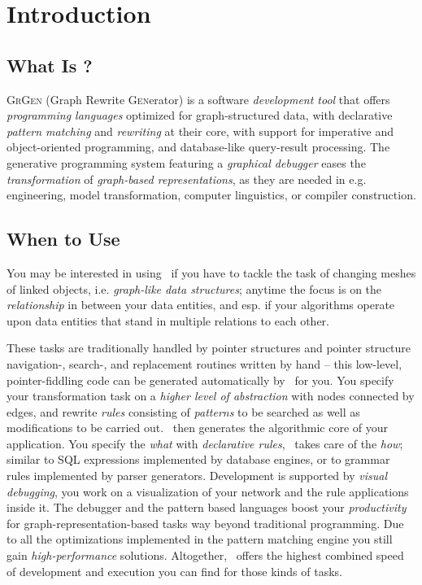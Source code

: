 \chapter{Introduction}
\label{chp:intro}


\section{What Is \GrG?}

{\scshape GrGen} (\textsc{G}raph \textsc{R}ewrite \textsc{Gen}erator) is a software \emph{development tool} that offers \emph{programming languages} optimized for graph-structured data, with declarative \emph{pattern matching} and \emph{rewriting} at their core, with support for imperative and object-oriented programming, and database-like query-result processing.
The generative programming system featuring a \emph{graphical debugger} eases the \emph{transformation} of \emph{graph-based representations}, as they are needed in e.g. engineering, model transformation, computer linguistics, or compiler construction.

\section{When to Use \GrG}
You may be interested in using \GrG\ if you have to tackle the task of changing meshes of linked objects, i.e. \emph{graph-like data structures};
anytime the focus is on the \emph{relationship} in between your data entities,
and esp. if your algorithms operate upon data entities that stand in multiple relations to each other.

These tasks are traditionally handled by pointer structures and pointer structure navi\-gation-, search-, and replacement routines written by hand
-- this low-level, pointer-fiddling code can be generated automatically by \GrG\ for you.
You specify your transformation task on a \emph{higher level of abstraction} with nodes connected by edges,
and rewrite \emph{rules} consisting of \emph{patterns} to be searched as well as modifications to be carried out.
\GrG\ then generates the algorithmic core of your application.
You specify the \emph{what} with \emph{declarative rules}, \GrG\ takes care of the \emph{how};
similar to SQL expressions implemented by database engines, 
or to grammar rules implemented by parser generators.
Development is supported by \emph{visual debugging}, you work on a visualization of your network and the rule applications inside it.
The debugger and the pattern based languages boost your \emph{productivity} for graph-representation-based tasks way beyond traditional programming.
Due to all the optimizations implemented in the pattern matching engine you still gain \emph{high-performance} solutions.
Altogether, \GrG\ offers the highest combined speed of development and execution you can find for those kinds of tasks.

